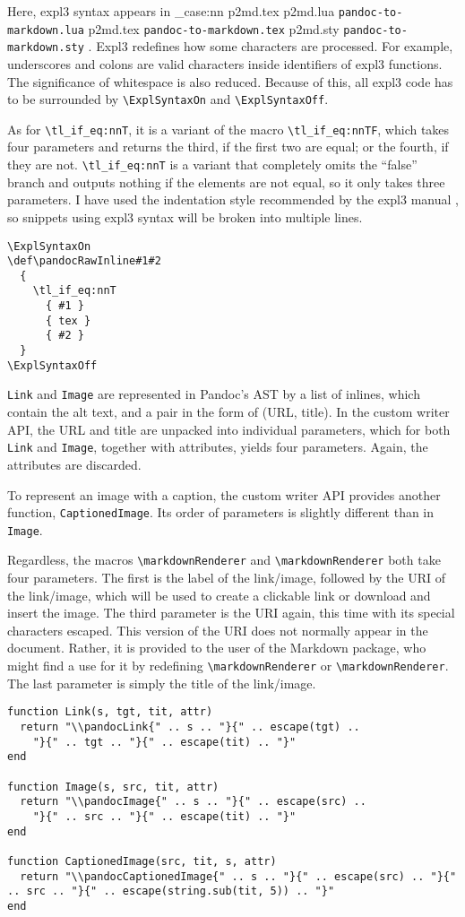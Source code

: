 \documentclass[
  digital,     %
  oneside,     %
  nosansbold,  %
  nocolorbold, %
  lof,         %
  nolot,       %
]{fithesis4}
\newcommand\macro[1]{\texttt{\textbackslash{}{#1}}}
\newcommand\renderer[1]{\macro{markdown\-Renderer\-{#1}}}
\newcommand\file[1]
  {
    \str_case:nn
      { #1 }
      {
        { p2md.lua } { \texttt{pandoc\hyp{}to\hyp{}markdown.lua} }
        { p2md.tex } { \texttt{pandoc\hyp{}to\hyp{}markdown.tex} }
        { p2md.sty } { \texttt{pandoc\hyp{}to\hyp{}markdown.sty} }
      }
  }
\begin{document}
Here, expl3 syntax appears in \file{p2md.tex}. Expl3 redefines how some characters are processed. For example, underscores and colons are valid characters inside identifiers of expl3 functions. The significance of whitespace is also reduced. Because of this, all expl3 code has to be surrounded by \macro{ExplSyntaxOn} and \macro{ExplSyntaxOff}.

As for \macro{tl\_if\_eq:nnT}, it is a variant of the macro \macro{tl\_if\_eq:nnTF}, which takes four parameters and returns the third, if the first two are equal; or the fourth, if they are not. \macro{tl\_if\_eq:nnT} is a variant that completely omits the ``false'' branch and outputs nothing if the elements are not equal, so it only takes three parameters. I have used the indentation style recommended by the expl3 manual \cite{l3-expl3}, so snippets using expl3 syntax will be broken into multiple lines.

\noindent
\lstset{language=[plain]TeX}
\begin{lstlisting}
\ExplSyntaxOn
\def\pandocRawInline#1#2
  {
    \tl_if_eq:nnT
      { #1 }
      { tex }
      { #2 }
  }
\ExplSyntaxOff
\end{lstlisting}

\noindent
\texttt{Link} and \texttt{Image} are represented in Pandoc's AST by a list of inlines, which contain the alt text, and a pair in the form of (URL, title). In the custom writer API, the URL and title are unpacked into individual parameters, which for both \texttt{Link} and \texttt{Image}, together with attributes, yields four parameters. Again, the attributes are discarded.

To represent an image with a caption, the custom writer API provides another function, \texttt{CaptionedImage}. Its order of parameters is slightly different than in \texttt{Image}.

Regardless, the macros \renderer{Link} and \renderer{Image} both take four parameters. The first is the label of the link/image, followed by the URI of the link/image, which will be used to create a clickable link or download and insert the image. The third parameter is the URI again, this time with its special characters escaped. This version of the URI does not normally appear in the document. Rather, it is provided to the user of the Markdown package, who might find a use for it by redefining \renderer{Link} or \renderer{Image}.
The last parameter is simply the title of the link/image.

\noindent
\lstset{language=[5.3]Lua}
\begin{lstlisting}
function Link(s, tgt, tit, attr)
  return "\\pandocLink{" .. s .. "}{" .. escape(tgt) ..
    "}{" .. tgt .. "}{" .. escape(tit) .. "}"
end

function Image(s, src, tit, attr)
  return "\\pandocImage{" .. s .. "}{" .. escape(src) ..
    "}{" .. src .. "}{" .. escape(tit) .. "}"
end

function CaptionedImage(src, tit, s, attr)
  return "\\pandocCaptionedImage{" .. s .. "}{" .. escape(src) .. "}{" .. src .. "}{" .. escape(string.sub(tit, 5)) .. "}"
end
\end{lstlisting}
\end{document}
